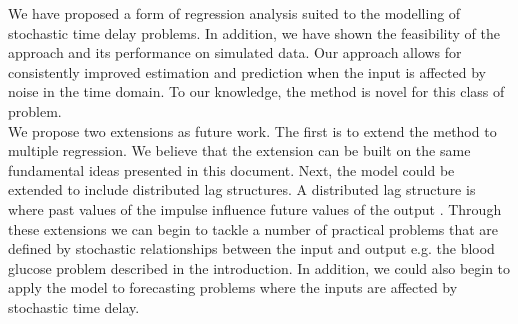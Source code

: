\documentclass[11pt]{amsart}
\theoremstyle{definition}
\begin{document}
We have proposed a form of regression analysis suited to the modelling of stochastic time delay problems. In addition, we have shown the feasibility of the approach and its performance on simulated data. Our approach allows for consistently improved estimation and prediction when the input is affected by noise in the time domain. To our knowledge, the method is novel for this class of problem.\\

We propose two extensions as future work. The first is to extend the method to multiple regression. We believe that the extension can be built on the same fundamental ideas presented in this document. Next, the model could be extended to include distributed lag structures. A distributed lag structure is where past values of the impulse influence future values of the output \cite{almon}. Through these extensions we can begin to tackle a number of practical problems that are defined by stochastic relationships between the input and output e.g. the blood glucose problem described in the introduction. In addition, we could also begin to apply the model to forecasting problems where the inputs are affected by stochastic time delay.



 
\end{document}
